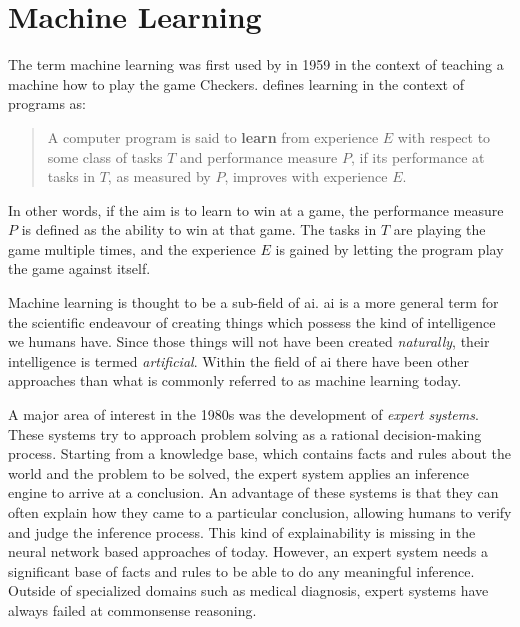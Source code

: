 \documentclass[final]{vutinfth} %
\begin{document}
\section{Machine Learning}
\label{sec:theory-ml}

The term machine learning was first used by \textcite{samuel1959} in
1959 in the context of teaching a machine how to play the game
Checkers. \textcite{mitchell1997a} defines learning in the context of
programs as:
\begin{quote}
  A computer program is said to \textbf{learn} from experience $E$
  with respect to some class of tasks $T$ and performance measure $P$,
  if its performance at tasks in $T$, as measured by $P$, improves
  with experience $E$. \cite[p.2]{mitchell1997a}
\end{quote}
In other words, if the aim is to learn to win at a game, the
performance measure $P$ is defined as the ability to win at that
game. The tasks in $T$ are playing the game multiple times, and the
experience $E$ is gained by letting the program play the game against
itself.

Machine learning is thought to be a sub-field of \gls{ai}. \gls{ai} is
a more general term for the scientific endeavour of creating things
which possess the kind of intelligence we humans have. Since those
things will not have been created \emph{naturally}, their intelligence
is termed \emph{artificial}. Within the field of \gls{ai} there have
been other approaches than what is commonly referred to as machine
learning today.

A major area of interest in the 1980s was the development of
\emph{expert systems}. These systems try to approach problem solving
as a rational decision-making process. Starting from a knowledge base,
which contains facts and rules about the world and the problem to be
solved, the expert system applies an inference engine to arrive at a
conclusion. An advantage of these systems is that they can often
explain how they came to a particular conclusion, allowing humans to
verify and judge the inference process. This kind of explainability is
missing in the neural network based approaches of today. However, an
expert system needs a significant base of facts and rules to be able
to do any meaningful inference. Outside of specialized domains such as
medical diagnosis, expert systems have always failed at commonsense
reasoning.
\end{document}
